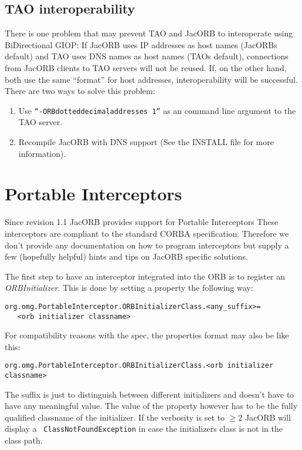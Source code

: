 \documentclass[12pt]{scrbook}
\begin{document}
\section{TAO interoperability}
There is one problem that may prevent TAO and JacORB to interoperate using
BiDirectional GIOP: If JacORB uses IP addresses as host names (JacORBs
default) and TAO uses DNS names as host names (TAOs default), connections
from JacORB clients to TAO servers will not be reused. If, on the other hand,
both use the same ``format'' for host addresses, interoperability will be
successful. There are two ways to solve this problem:
\begin{enumerate}
\item Use {\tt ``-ORBdotteddecimaladdresses 1''} as an command line argument
  to the TAO server.
\item Recompile JacORB with DNS support (See the INSTALL file for more
  information).
\end{enumerate}



\chapter{Portable Interceptors}

Since revision 1.1 JacORB provides support for Portable Interceptors These
interceptors are compliant to the standard CORBA specification.  Therefore we
don't provide any documentation on how to program interceptors but supply a
few (hopefully helpful) hints and tips on JacORB specific solutions.

The first  step to have an  interceptor integrated into the  ORB is to
register an {\em  ORBInitializer}. This is done by  setting a property
the following way:
\begin{verbatim}org.omg.PortableInterceptor.ORBInitializerClass.<any_suffix>=
   <orb initializer classname>
\end{verbatim}

For compatibility reasons with the spec, the properties format may also be
like this:

\begin{verbatim}org.omg.PortableInterceptor.ORBInitializerClass.<orb initializer classname>
\end{verbatim}

The suffix  is just to distinguish between  different initializers and
doesn't have to  have any meaningful value. The  value of the property
however has to be the fully qualified classname of the initializer. If
the  verbosity  is  set  to  $\geq  2$  JacORB  will  display  a  {\tt
ClassNotFoundException} in  case the initializers class is  not in the
class path.
\end{document}
